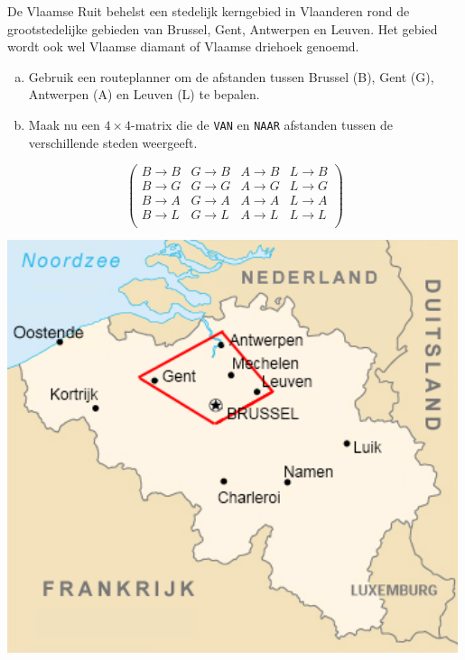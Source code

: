 \documentclass[12pt,twoside]{article}
\begin{document}
\begin{oefening}
De Vlaamse Ruit behelst een stedelijk kerngebied in Vlaanderen rond de grootstedelijke gebieden van Brussel, Gent, Antwerpen en Leuven. Het gebied wordt ook wel Vlaamse diamant of Vlaamse driehoek genoemd.\\
\begin{minipage}{0.5\textwidth}
\begin{enumerate}[(a)]
  \item Gebruik een routeplanner om de afstanden tussen Brussel (B), Gent (G), Antwerpen (A) en Leuven (L) te bepalen.
  \item Maak nu een $4 \times 4$-matrix die de \verb#VAN# en \verb#NAAR# afstanden tussen de verschillende steden weergeeft.
\end{enumerate}
$$\begin{pmatrix}
  B\to B & G\to B & A\to B & L\to B\\
  B\to G & G\to G & A\to G & L\to G\\
  B\to A & G\to A & A\to A & L\to A\\
  B\to L & G\to L & A\to L & L\to L\\
\end{pmatrix}$$
\end{minipage}
\begin{minipage}{0.5\textwidth}
\begin{center}
\includegraphics[width=0.99\textwidth]{Vlaamse_ruit}
\end{center}
\end{minipage}
\end{oefening}
\end{document}
